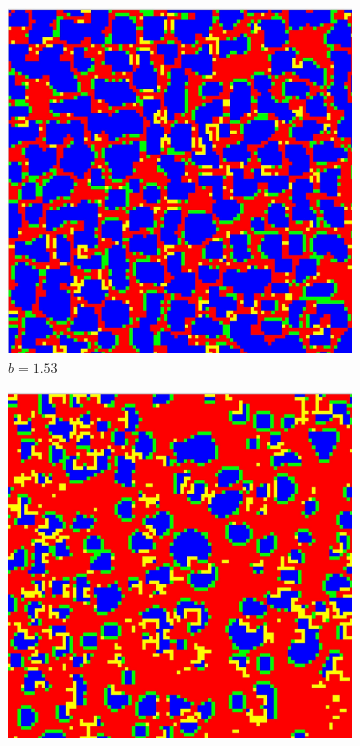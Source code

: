 \documentclass[12pt]{article}
\begin{document}
\begin{figure}[!htbp]
            \begin{subfigure}{.33\textwidth}
            \centering
            \includegraphics[width=.9\linewidth]{MeanFieldGame/snapshot_b=153.jpg}
            \caption{$b=1.53$}
            \label{fig:sub4}
            \end{subfigure}%
            \begin{subfigure}{.33\textwidth}
            \centering
            \includegraphics[width=.9\linewidth]{MeanFieldGame/snapshot_b=157.jpg}

\end{subfigure}
\end{figure}
\end{document}
